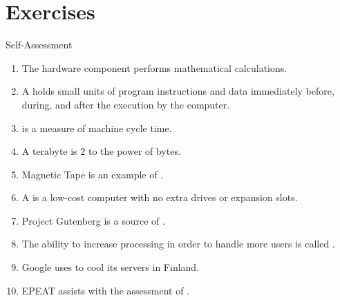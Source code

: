 \documentclass[\main/notes.tex]{subfiles}
\begin{document}
		\section{Exercises}
			\begin{exercise}{Self-Assessment}
				\begin{enumerate}
					\item The  hardware component performs mathematical calculations.
					\item A  holds small units of program instructions and data immediately before, during, and after the execution by the computer.
					\item {} is a measure of machine cycle time.
					\item A terabyte is 2 to the power of  bytes.
					\item Magnetic Tape is an example of .
					\item A  is a low-cost computer with no extra drives or expansion slots.
					\item Project Gutenberg is a source of .
					\item The ability to increase processing in order to handle more users is called .
					\item Google uses  to cool its servers in Finland.
					\item EPEAT assists with the assessment of .
				\end{enumerate}
			\end{exercise}
	\vbox{}
\end{document}
